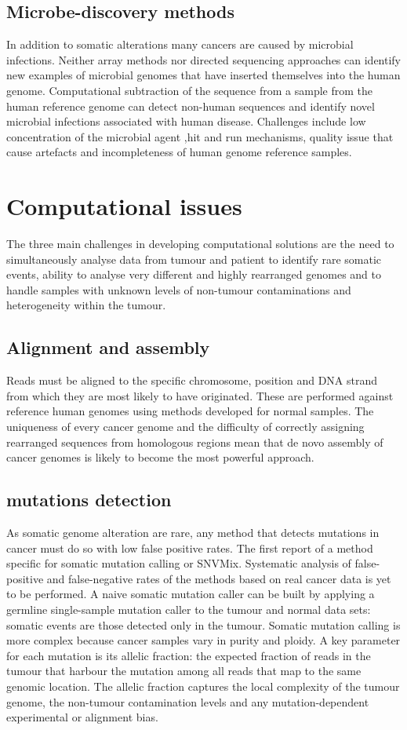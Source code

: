 	\subsection{Microbe-discovery methods}
	In addition to somatic alterations many cancers are caused by microbial infections.
	Neither array methods nor directed sequencing approaches can identify new examples of microbial genomes that have inserted themselves into the human genome.
	Computational subtraction of the sequence from a sample from the human reference genome can detect non-human sequences and identify novel microbial infections associated with human disease.
	Challenges include low concentration of the microbial agent ,hit and run mechanisms, quality issue that cause artefacts and incompleteness of human genome reference samples.

\section{Computational issues}
The three main challenges in developing computational solutions are the need to simultaneously analyse data from tumour and patient to identify rare somatic events, ability to analyse very different and highly rearranged genomes and to handle samples with unknown levels of non-tumour contaminations and heterogeneity within the tumour.

	\subsection{Alignment and assembly}
	Reads must be aligned to the specific chromosome, position and DNA strand from which they are most likely to have originated.
	These are performed against reference human genomes using methods developed for normal samples.
	The uniqueness of every cancer genome and the difficulty of correctly assigning rearranged sequences from homologous regions mean that de novo assembly of cancer genomes is likely to become the most powerful approach.

	\subsection{mutations detection}
	As somatic genome alteration are rare, any method that detects mutations in cancer must do so with low false positive rates.
	The first report of a method specific for somatic mutation calling or SNVMix.
	Systematic analysis of false-positive and false-negative rates of the methods based on real cancer data is yet to be performed.
	A naive somatic mutation caller can be built by applying a germline single-sample mutation caller to the tumour and normal data sets: somatic events are those detected only in the tumour.
	Somatic mutation calling is more complex because cancer samples vary in purity and ploidy.
	A key parameter for each mutation is its allelic fraction: the expected fraction of reads in the tumour that harbour the mutation among all reads that map to the same genomic location.
	The allelic fraction captures the local complexity of the tumour genome, the non-tumour contamination levels and any mutation-dependent experimental or alignment bias.

